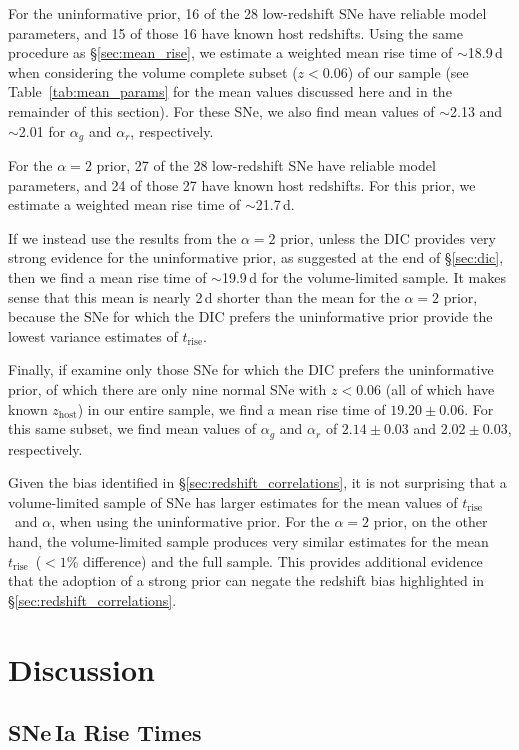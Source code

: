 \documentclass[twocolumn]{./aastex63}
\newcommand{\trise}{$t_\mathrm{rise}$}
\begin{document}
For the uninformative prior, 16 of the 28 low-redshift SNe have reliable model
parameters, and 15 of those 16 have known host redshifts. Using the same
procedure as \S\ref{sec:mean_rise}, we estimate a weighted mean rise time of
$\sim$18.9\,d when considering the volume complete subset ($z < 0.06$)
of our sample (see Table~\ref{tab:mean_params} for the mean values discussed
here and in the remainder of this section). For these SNe, we also find mean
values of $\sim$2.13 and $\sim$2.01 for $\alpha_g$ and $\alpha_r$,
respectively.

For the $\alpha = 2$ prior, 27 of the 28 low-redshift SNe have reliable model
parameters, and 24 of those 27 have known host redshifts. For this prior, we
estimate a weighted mean rise time of $\sim$21.7\,d.

If we instead use the results from the $\alpha = 2$ prior, unless the DIC
provides very strong evidence for the uninformative prior, as suggested at the
end of \S\ref{sec:dic}, then we find a mean rise time of $\sim$19.9\,d
for the volume-limited sample. It makes sense that this mean is nearly 2\,d
shorter than the mean for the $\alpha=2$ prior, because the SNe for which the
DIC prefers the uninformative prior provide the lowest variance estimates of
\trise.

Finally, if examine only those SNe for which the DIC prefers the uninformative
prior, of which there are only nine normal SNe with $z < 0.06$ (all of which
have known $z_\mathrm{host}$) in our entire sample, we find a mean rise time
of $19.20 \pm 0.06$. For this same subset, we find mean values of $\alpha_g$
and $\alpha_r$ of $2.14 \pm 0.03$ and $2.02 \pm 0.03$, respectively.

Given the bias identified in \S\ref{sec:redshift_correlations}, it is not
surprising that a volume-limited sample of SNe has larger estimates for the
mean values of \trise\ and $\alpha$, when using the uninformative prior. For
the $\alpha = 2$ prior, on the other hand, the volume-limited sample produces
very similar estimates for the mean \trise\ ($< 1\%$ difference) and the full
sample. This provides additional evidence that the adoption of a strong prior
can negate the redshift bias highlighted in \S\ref{sec:redshift_correlations}.

\section{Discussion}

\subsection{SNe\,Ia Rise Times}
\end{document}
